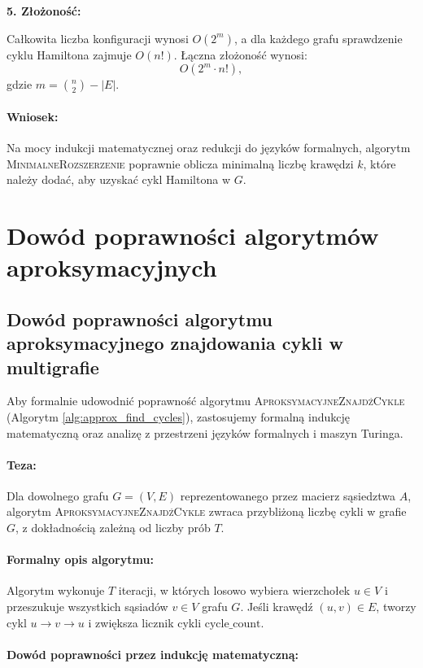 \textbf{5. Złożoność:}

Całkowita liczba konfiguracji wynosi \( O(2^m) \), a dla każdego grafu sprawdzenie cyklu Hamiltona zajmuje \( O(n!) \). Łączna złożoność wynosi:
\[
O(2^m \cdot n!),
\]
gdzie \( m = \binom{n}{2} - |E| \).

\paragraph{Wniosek:}
Na mocy indukcji matematycznej oraz redukcji do języków formalnych, algorytm \textsc{MinimalneRozszerzenie} poprawnie oblicza minimalną liczbę krawędzi \( k \), które należy dodać, aby uzyskać cykl Hamiltona w \( G \).


\section{Dowód poprawności algorytmów aproksymacyjnych}

\subsection{Dowód poprawności algorytmu aproksymacyjnego znajdowania cykli w multigrafie}

Aby formalnie udowodnić poprawność algorytmu \textsc{AproksymacyjneZnajdźCykle} (Algorytm \ref{alg:approx_find_cycles}), zastosujemy formalną indukcję matematyczną oraz analizę z przestrzeni języków formalnych i maszyn Turinga.

\paragraph{Teza:}
Dla dowolnego grafu \( G = (V, E) \) reprezentowanego przez macierz sąsiedztwa \( A \), algorytm \textsc{AproksymacyjneZnajdźCykle} zwraca przybliżoną liczbę cykli w grafie \( G \), z dokładnością zależną od liczby prób \( T \).

\paragraph{Formalny opis algorytmu:}
Algorytm wykonuje \( T \) iteracji, w których losowo wybiera wierzchołek \( u \in V \) i przeszukuje wszystkich sąsiadów \( v \in V \) grafu \( G \). Jeśli krawędź \( (u, v) \in E \), tworzy cykl \( u \to v \to u \) i zwiększa licznik cykli \( \text{cycle\_count} \).

\paragraph{Dowód poprawności przez indukcję matematyczną:}

